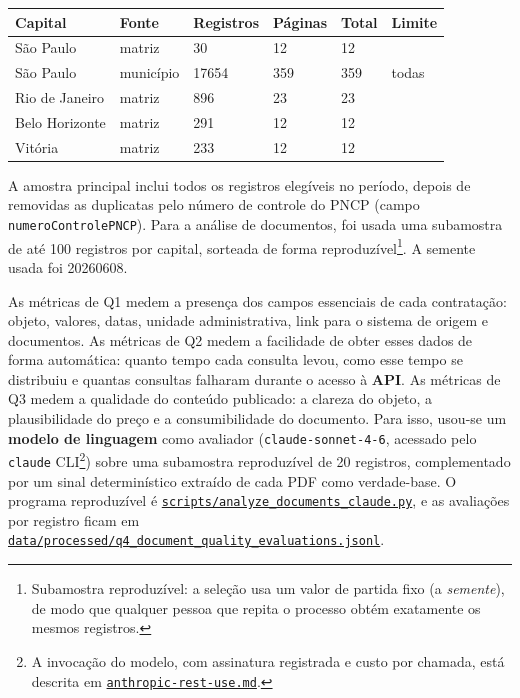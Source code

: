 \documentclass[12pt]{article}
\newcounter{none}
\begin{document}
{\def\LTcaptype{none} %
\begin{longtable}[]{@{}llllll@{}}
\toprule\noalign{}
Capital & Fonte & Registros & Páginas & Total & Limite \\
\midrule\noalign{}
\endhead
\bottomrule\noalign{}
\endlastfoot
São Paulo & matriz & 30 & 12 & 12 & \\
São Paulo & município & 17654 & 359 & 359 & todas \\
Rio de Janeiro & matriz & 896 & 23 & 23 & \\
Belo Horizonte & matriz & 291 & 12 & 12 & \\
Vitória & matriz & 233 & 12 & 12 & \\
\end{longtable}
}

A amostra principal inclui todos os registros elegíveis no período,
depois de removidas as duplicatas pelo número de controle do PNCP (campo
\texttt{numeroControlePNCP}). Para a análise de documentos, foi usada
uma subamostra de até 100 registros por capital, sorteada de forma
reproduzível\footnote{Subamostra reproduzível: a seleção usa um valor de
  partida fixo (a \emph{semente}), de modo que qualquer pessoa que
  repita o processo obtém exatamente os mesmos registros.}. A semente
usada foi 20260608.

As métricas de Q1 medem a presença dos campos essenciais de cada
contratação: objeto, valores, datas, unidade administrativa, link para o
sistema de origem e documentos. As métricas de Q2 medem a facilidade de
obter esses dados de forma automática: quanto tempo cada consulta levou,
como esse tempo se distribuiu e quantas consultas falharam durante o
acesso à \textbf{API}. As métricas de Q3 medem a qualidade do conteúdo
publicado: a clareza do objeto, a plausibilidade do preço e a
consumibilidade do documento. Para isso, usou-se um \textbf{modelo de
linguagem} como avaliador (\texttt{claude-sonnet-4-6}, acessado pelo
\texttt{claude} CLI\footnote{A invocação do modelo, com assinatura
  registrada e custo por chamada, está descrita em
  \href{https://github.com/Amorim33/analise-pncp/blob/main/anthropic-rest-use.md}{\texttt{anthropic-rest-use.md}}.})
sobre uma subamostra reproduzível de 20 registros, complementado por um
sinal determinístico extraído de cada PDF como verdade-base. O programa
reproduzível é
\href{https://github.com/Amorim33/analise-pncp/blob/main/scripts/analyze_documents_claude.py}{\texttt{scripts/analyze\_documents\_claude.py}},
e as avaliações por registro ficam em
\href{https://github.com/Amorim33/analise-pncp/blob/main/data/processed/q4_document_quality_evaluations.jsonl}{\texttt{data/processed/q4\_document\_quality\_evaluations.jsonl}}.
\end{document}
